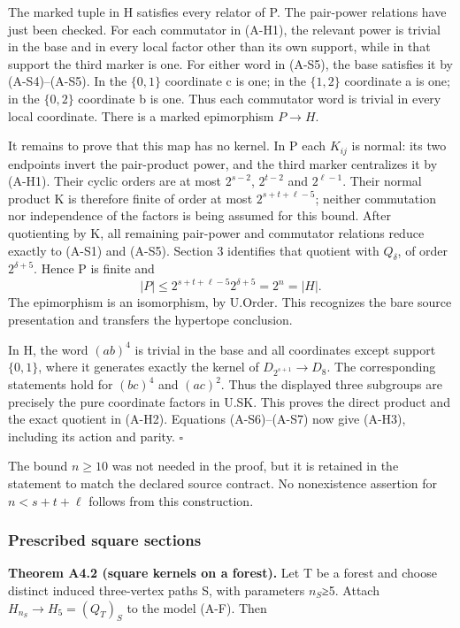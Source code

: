 \documentclass[
  11pt,
  a4paper,
]{article}
\newcounter{none} %
\begin{document}
The marked tuple in H satisfies every relator of P. The pair-power
relations have just been checked. For each commutator in (A-H1), the
relevant power is trivial in the base and in every local factor other
than its own support, while in that support the third marker is one. For
either word in (A-S5), the base satisfies it by (A-S4)--(A-S5). In the
\(\{0,1\}\) coordinate c is one; in the \(\{1,2\}\) coordinate a is one;
in the \(\{0,2\}\) coordinate b is one. Thus each commutator word is
trivial in every local coordinate. There is a marked epimorphism
\(P\to H\).

It remains to prove that this map has no kernel. In P each \(K_{ij}\) is
normal: its two endpoints invert the pair-product power, and the third
marker centralizes it by (A-H1). Their cyclic orders are at most
\(2^{s-2}\), \(2^{t-2}\) and \(2^{\ell-1}\). Their normal product K is
therefore finite of order at most \(2^{s+t+\ell-5}\); neither
commutation nor independence of the factors is being assumed for this
bound. After quotienting by K, all remaining pair-power and commutator
relations reduce exactly to (A-S1) and (A-S5). Section 3 identifies that
quotient with \(Q_\delta\), of order \(2^{\delta+5}\). Hence P is finite
and \[
 |P|\le2^{s+t+\ell-5}2^{\delta+5}=2^n=|H|.
\] The epimorphism is an isomorphism, by U.Order. This recognizes the
bare source presentation and transfers the hypertope conclusion.

In H, the word \((ab)^4\) is trivial in the base and all coordinates
except support \(\{0,1\}\), where it generates exactly the kernel of
\(D_{2^{s+1}}\to D_8\). The corresponding statements hold for \((bc)^4\)
and \((ac)^2\). Thus the displayed three subgroups are precisely the
pure coordinate factors in U.SK. This proves the direct product and the
exact quotient in (A-H2). Equations (A-S6)--(A-S7) now give (A-H3),
including its action and parity. \(\square\)

The bound \(n\ge10\) was not needed in the proof, but it is retained in
the statement to match the declared source contract. No nonexistence
assertion for \(n<s+t+\ell\) follows from this construction.

\subsubsection{Prescribed square
sections}\label{prescribed-square-sections}

\textbf{Theorem A4.2 (square kernels on a forest).} Let T be a forest
and choose distinct induced three-vertex paths S, with parameters
\(n_S\)≥5. Attach \(H_{n_S}\to H_5=(Q_T)_S\) to the model (A-F). Then
\end{document}
